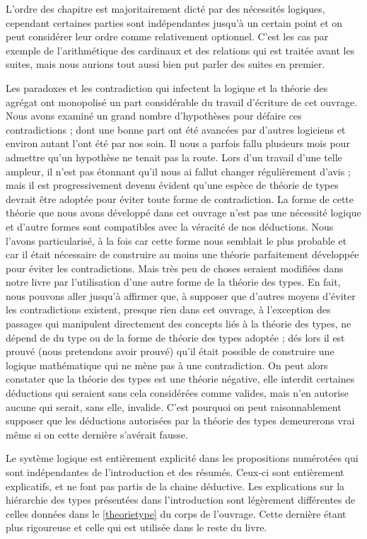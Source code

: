 \documentclass[a4paper]{book}
\begin{document}
L'ordre des chapitre est majoritairement dicté par des nécessités logiques, cependant certaines parties sont indépendantes jusqu'à un certain point et on peut considérer leur ordre comme relativement optionnel. C'est les cas par exemple de l'arithmétique des cardinaux et des relations qui est traitée avant les suites, mais nous aurions tout aussi bien put parler des suites en premier.
 
Les paradoxes et les contradiction qui infectent la logique et la théorie des agrégat ont monopolisé un part considérable du travail d'écriture de cet ouvrage. Nous avons examiné un grand nombre d'hypothèses pour défaire ces contradictions ; dont une bonne part ont été avancées par d'autres logiciens et environ autant l'ont été par nos soin. Il nous a parfois fallu plusieurs mois pour admettre qu'un hypothèse ne tenait pas la route. Lors d'un travail d'une telle ampleur, il n'est pas étonnant qu'il nous ai fallut changer régulièrement d'avis ; mais il est progressivement devenu évident qu'une espèce de théorie de types devrait être adoptée pour éviter toute forme de contradiction. La forme de cette théorie que nous avons développé dans cet ouvrage n'est pas une nécessité logique et d'autre formes sont compatibles avec la véracité de nos déductions. Nous l'avons particularisé, à la fois car cette forme nous semblait le plus probable et car il était nécessaire de construire au moins une théorie parfaitement développée pour éviter les contradictions. Mais très peu de choses seraient modifiées dans notre livre par l'utilisation d'une autre forme de la théorie des types. En fait, nous pouvons aller jusqu'à affirmer que, à supposer que d'autres moyens d'éviter les contradictions existent, presque rien dans cet ouvrage, à l'exception des passages qui manipulent directement des concepts liés à la théorie des types, ne dépend de du type ou de la forme de théorie des types adoptée ; dés lors il est prouvé (nous pretendons avoir prouvé) qu'il était possible de construire une logique mathématique qui ne mène pas à une contradiction. On peut alors constater que la théorie des types est une théorie négative, elle interdit certaines déductions qui seraient sans cela considérées comme valides, mais n'en autorise aucune qui serait, sans elle, invalide. C'est pourquoi on peut raisonnablement supposer que les déductions autorisées par la théorie des types demeurerons vrai même si on cette dernière s'avérait fausse. 
 
Le système logique est entièrement explicité dans les propositions numérotées qui sont indépendantes de l'introduction et des résumés. Ceux-ci sont entièrement explicatifs, et ne font pas partis de la chaine déductive. Les explications sur la hiérarchie des types présentées dans l'introduction sont légèrement différentes de celles données dans le \ref{theorietype} du corps de l'ouvrage. Cette dernière étant plus rigoureuse et celle qui est utilisée dans le reste du livre. 
 
\end{document}
